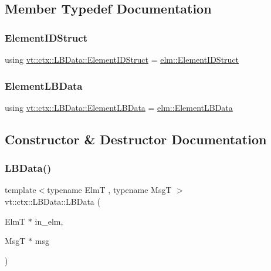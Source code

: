 \subsection{Member Typedef Documentation}
\mbox{\label{structvt_1_1ctx_1_1_l_b_data_aad9fac05c3faf80173b273d900db6fb1}} 
\subsubsection{\texorpdfstring{Element\+I\+D\+Struct}{ElementIDStruct}}
{\footnotesize\ttfamily using \hyperlink{structvt_1_1ctx_1_1_l_b_data_aad9fac05c3faf80173b273d900db6fb1}{vt\+::ctx\+::\+L\+B\+Data\+::\+Element\+I\+D\+Struct} =  \hyperlink{structvt_1_1elm_1_1_element_i_d_struct}{elm\+::\+Element\+I\+D\+Struct}}

\mbox{\label{structvt_1_1ctx_1_1_l_b_data_a11f1aeb75c01ae0c77d96f94ce1994bb}} 
\subsubsection{\texorpdfstring{Element\+L\+B\+Data}{ElementLBData}}
{\footnotesize\ttfamily using \hyperlink{structvt_1_1ctx_1_1_l_b_data_a11f1aeb75c01ae0c77d96f94ce1994bb}{vt\+::ctx\+::\+L\+B\+Data\+::\+Element\+L\+B\+Data} =  \hyperlink{structvt_1_1elm_1_1_element_l_b_data}{elm\+::\+Element\+L\+B\+Data}}



\subsection{Constructor \& Destructor Documentation}
\mbox{\label{structvt_1_1ctx_1_1_l_b_data_aeee7259db248f19afcc19179c1a623ba}} 
\subsubsection{\texorpdfstring{L\+B\+Data()}{LBData()}\hspace{0.1cm}{\footnotesize\ttfamily [1/2]}}
{\footnotesize\ttfamily template$<$typename ElmT , typename MsgT $>$ \\
vt\+::ctx\+::\+L\+B\+Data\+::\+L\+B\+Data (\begin{DoxyParamCaption}\item[{ElmT $\ast$}]{in\+\_\+elm,  }\item[{MsgT $\ast$}]{msg }\end{DoxyParamCaption})}



